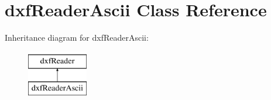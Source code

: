 \hypertarget{classdxfReaderAscii}{\section{dxf\-Reader\-Ascii Class Reference}
\label{classdxfReaderAscii}
}
Inheritance diagram for dxf\-Reader\-Ascii\-:\begin{figure}[H]
\begin{center}
\leavevmode
\includegraphics[height=2.000000cm]{classdxfReaderAscii}
\end{center}
\end{figure}

